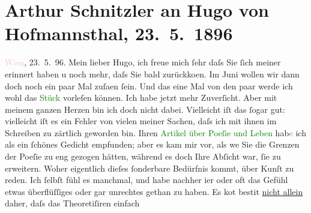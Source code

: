 

               \section[Arthur Schnitzler an Hugo von Hofmannsthal, 23. 5. 1896]{ Arthur Schnitzler an Hugo von Hofmannsthal, 23. 5. 1896}\nopagebreak{}\rehead{ }\normalsize\beginnumbering{} \toendnotes[C]{\smallbreak\pagebreak[2]} 
\toendnotes[C]{\smallbreak}\pstart
           \raggedleft{}{\pb}\textcolor{pink}{Wien}{}\ledrightnote{\textcolor{pink}{Wien}}, 23. 5. 96.\pend
           \pstart
           Mein lieber Hugo, ich freue mich ſehr daſs Sie ſich meiner
                    erinnert haben u noch mehr, daſs Sie bald zurückko{\geminationm}en. Im Juni wollen wir dann doch noch ein paar Mal zuſa{\geminationm}en ſein. Und das eine Mal von den paar werde ich
                    wohl das \textcolor{green}{Stück}{} vorleſen
                    können. Ich habe jetzt mehr Zuverſicht. Aber mit meinem ganzen Herzen bin ich
                    doch nicht dabei. Vielleicht iſt das ſogar gut: vielleicht {\pb}iſt es ein Fehler von vielen meiner Sachen, daſs ich
                    mit ihnen im Schreiben zu zärtlich geworden bin.\pend
           \pstart
           Ihren \textcolor{green}{Artikel über Poeſie und
                        Leben}{} hab\textcolor{gray}{e} ich als ein ſchönes Gedicht empfunden; aber es kam mir vor,
                    als we{\geminationn} Sie die Grenzen der Poeſie zu eng gezogen
                    hätten, während es doch Ihre Abſicht war, ſie zu erweitern. Woher eigentlich
                    dieſes ſonderbare Bedürfnis kommt, über Kunſt zu reden. Ich ſelbſt fühl es
                    manchmal, und {\pb}habe nachher i{\geminationm}er oder oft das Gefühl etwas überflüſſiges oder
                    gar unrechtes gethan \introOben{}zu\introOben{} haben. Es ko{\geminationm}t besti{\geminationm}t \uline{nicht allein} daher, daſs das Theoretiſiren einfach
